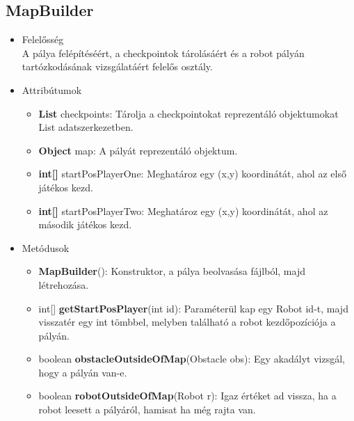 \subsection{MapBuilder}
\begin{itemize}
\item Felelősség\\
A pálya felépítéséért, a checkpointok tárolásáért és a robot pályán tartózkodásának vizsgálatáért felelős osztály.
\item Attribútumok
	\begin{itemize}
		\item \textbf{List} checkpoints: Tárolja a checkpointokat reprezentáló objektumokat List adatszerkezetben.
		\item \textbf{Object} map: A pályát reprezentáló objektum.
		\item \textbf{int[]} startPosPlayerOne: Meghatároz egy (x,y) koordinátát, ahol az első játékos kezd.
		\item \textbf{int[]} startPosPlayerTwo: Meghatároz egy (x,y) koordinátát, ahol az második játékos kezd.
	\end{itemize}
\item Metódusok
	\begin{itemize}
		\item \textbf{MapBuilder}(): Konstruktor, a pálya beolvasása fájlból, majd létrehozása.
		\item int[] \textbf{getStartPosPlayer}(int id): Paraméterül kap egy Robot id-t, majd visszatér egy int tömbbel, melyben található a robot kezdőpozíciója a pályán.
		 \item boolean \textbf{obstacleOutsideOfMap}(Obstacle obs): Egy akadályt vizsgál, hogy a pályán van-e.
		\item boolean \textbf{robotOutsideOfMap}(Robot r): Igaz értéket ad vissza, ha a robot leesett a pályáról, hamisat ha még rajta van.
	\end{itemize}
\end{itemize}

